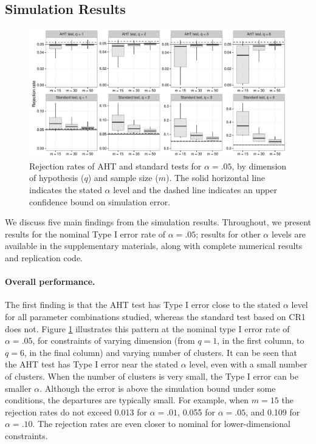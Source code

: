 \documentclass[12pt]{article}\usepackage[]{graphicx}\usepackage[]{color}
\newenvironment{knitrout}{}{} %
\begin{document}
\subsection{Simulation Results}

\begin{knitrout}
\color{fgcolor}\begin{figure}

{\centering \includegraphics[width=\linewidth]{CR_fig/overview-1} 

}

\caption[Rejection rates of AHT and standard tests for ]{Rejection rates of AHT and standard tests for $\alpha = .05$, by dimension of hypothesis ($q$) and sample size ($m$). The solid horizontal line indicates the stated $\alpha$ level and the dashed line indicates an upper confidence bound on simulation error.}\label{fig:overview}
\end{figure}


\end{knitrout}

We discuss five main findings from the simulation results.
Throughout, we present results for the nominal Type I error rate of $\alpha = .05$; results for other $\alpha$ levels are available in the supplementary materials, along with complete numerical results and replication code.

\paragraph{Overall performance.} The first finding is that the AHT test has Type I error close to the stated $\alpha$ level for all parameter combinations studied, whereas the standard test based on CR1 does not. 
Figure \ref{fig:overview} illustrates this pattern at the nominal type I error rate of $\alpha = .05$, for constraints of varying dimension (from $q = 1$, in the first column, to $q = 6$, in the final column) and varying number of clusters.
It can be seen that the AHT test has Type I error near the stated $\alpha$ level, even with a small number of clusters.
When the number of clusters is very small, the Type I error can be smaller $\alpha$. 
Although the error is above the simulation bound under some conditions, the departures are typically small. For example, when $m = 15$ the rejection rates do not exceed 0.013 for $\alpha = .01$, 0.055 for $\alpha = .05$, and 0.109 for $\alpha = .10$.
The rejection rates are even closer to nominal for lower-dimensional constraints.
\end{document}
